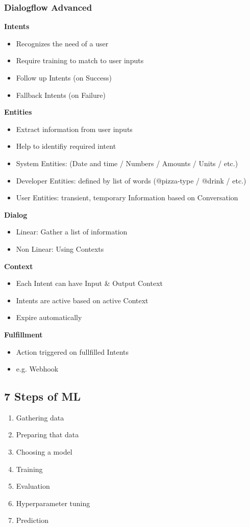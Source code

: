 \subsubsection{Dialogflow Advanced}
\textbf{Intents}
\begin{itemize}
    \item Recognizes the need of a user
    \item Require training to match to user inputs
    \item Follow up Intents (on Success)
    \item Fallback Intents (on Failure)
\end{itemize}
\textbf{Entities}
\begin{itemize}
    \item Extract information from user inputs
    \item Help to identifiy required intent
    \item System Entities: (Date and time / Numbers / Amounts / Units / etc.)
    \item Developer Entities: defined by list of words (@pizza-type / @drink / etc.)
    \item User Entities: transient, temporary Information based on Conversation
\end{itemize}
\textbf{Dialog}
\begin{itemize}
    \item Linear: Gather a list of information
    \item Non Linear: Using Contexts
\end{itemize}
\textbf{Context}
\begin{itemize}
    \item Each Intent can have Input \& Output Context
    \item Intents are active based on active Context
    \item Expire automatically
\end{itemize}
\textbf{Fulfillment}
\begin{itemize}
    \item Action triggered on fullfilled Intents
    \item e.g. Webhook
\end{itemize}

\subsection{7 Steps of ML}
\begin{enumerate}
    \item Gathering data
    \item Preparing that data
    \item Choosing a model
    \item Training
    \item Evaluation
    \item Hyperparameter tuning
    \item Prediction
\end{enumerate}